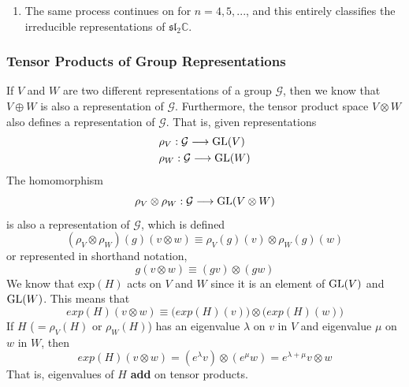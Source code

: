 \begin{enumerate}
    \item The same process continues on for $n=4, 5, ...$, and this entirely classifies the irreducible representations of $\mathfrak{sl}_2 \mathbb{C}$. 
  \end{enumerate}

  \subsubsection{Tensor Products of Group Representations}

    \begin{definition}
      If $V$ and $W$ are two different representations of a group $\mathcal{G}$, then we know that $V \oplus W$ is also a representation of $\mathcal{G}$. Furthermore, the tensor product space $V \otimes W$ also defines a representation of $\mathcal{G}$. That is, given representations
      \begin{align*}
        & \rho_V: \mathcal{G} \longrightarrow \operatorname{GL}(V) \\
        & \rho_W: \mathcal{G} \longrightarrow \operatorname{GL}(W)
      \end{align*}
      The homomorphism 
      \begin{equation}
        \rho_V \otimes \rho_W: \mathcal{G} \longrightarrow \operatorname{GL}(V \otimes W)
      \end{equation}
      is also a representation of $\mathcal{G}$, which is defined
      \begin{equation}
        (\rho_V \otimes \rho_W)(g) (v \otimes w) \equiv \rho_V (g) (v) \otimes \rho_W (g) (w)
      \end{equation}
      or represented in shorthand notation, 
      \begin{equation}
        g(v \otimes w) \equiv (g v) \otimes (g w)
      \end{equation}
      We know that exp$(H)$ acts on $V$ and $W$ since it is an element of $\operatorname{GL}(V)$ and $\operatorname{GL}(W)$. This means that
      \begin{equation}
        exp(H)(v \otimes w) \equiv \big( exp(H)(v)\big) \otimes \big( exp(H)(w)\big)
      \end{equation}
      If $H$ ($= \rho_V (H)$ or $\rho_W(H)$) has an eigenvalue $\lambda$ on $v$ in $V$ and eigenvalue $\mu$ on $w$ in $W$, then 
      \begin{equation}
        exp(H) (v \otimes w) = (e^\lambda v) \otimes (e^\mu w) = e^{\lambda + \mu} v \otimes w
      \end{equation}
      That is, eigenvalues of $H$ \textbf{add} on tensor products. 
    \end{definition}

